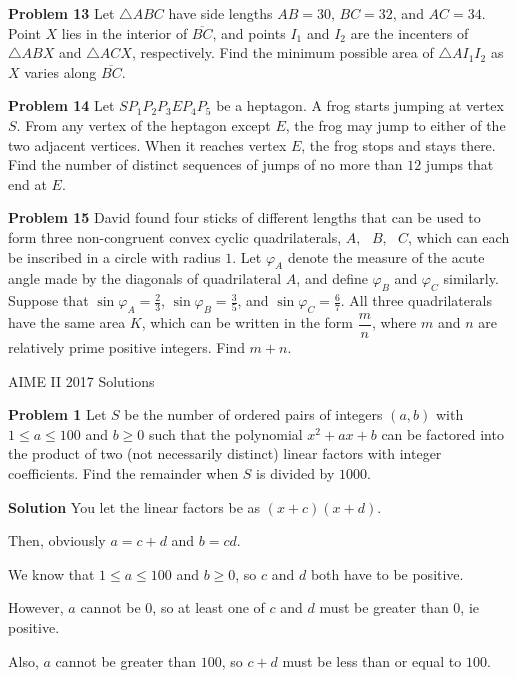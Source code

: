 \documentclass[a4paper,11pt]{article}
\begin{document}
\textbf{Problem 13}
Let $\triangle ABC$ have side lengths $AB=30$, $BC=32$, and $AC=34$. Point $X$ lies in the interior of $\overline{BC}$, and points $I_1$ and $I_2$ are the incenters of $\triangle ABX$ and $\triangle ACX$, respectively. Find the minimum possible area of $\triangle AI_1I_2$ as $X$ varies along $\overline{BC}$.

\textbf{Problem 14}
Let $SP_1P_2P_3EP_4P_5$ be a heptagon. A frog starts jumping at vertex $S$. From any vertex of the heptagon except $E$, the frog may jump to either of the two adjacent vertices. When it reaches vertex $E$, the frog stops and stays there. Find the number of distinct sequences of jumps of no more than $12$ jumps that end at $E$.

\textbf{Problem 15}
David found four sticks of different lengths that can be used to form three non-congruent convex cyclic quadrilaterals, $A,\text{ }B,\text{ }C$, which can each be inscribed in a circle with radius $1$. Let $\varphi_A$ denote the measure of the acute angle made by the diagonals of quadrilateral $A$, and define $\varphi_B$ and $\varphi_C$ similarly. Suppose that $\sin\varphi_A=\frac{2}{3}$, $\sin\varphi_B=\frac{3}{5}$, and $\sin\varphi_C=\frac{6}{7}$. All three quadrilaterals have the same area $K$, which can be written in the form $\dfrac{m}{n}$, where $m$ and $n$ are relatively prime positive integers. Find $m+n$.

\begin{center}
\begin{LARGE}
AIME II 2017 Solutions
\end{LARGE}
\end{center}

\textbf{Problem 1}
Let $S$ be the number of ordered pairs of integers $(a,b)$ with $1 \leq a \leq 100$ and $b \geq 0$ such that the polynomial $x^2+ax+b$ can be factored into the product of two (not necessarily distinct) linear factors with integer coefficients. Find the remainder when $S$ is divided by $1000$.

\textbf{Solution}
You let the linear factors be as $(x+c)(x+d)$.

Then, obviously $a=c+d$ and $b=cd$.

We know that $1\le a\le 100$ and $b\ge 0$, so $c$ and $d$ both have to be positive.

However, $a$ cannot be $0$, so at least one of $c$ and $d$ must be greater than $0$, ie positive.

Also, $a$ cannot be greater than $100$, so $c+d$ must be less than or equal to $100$.
\end{document}
